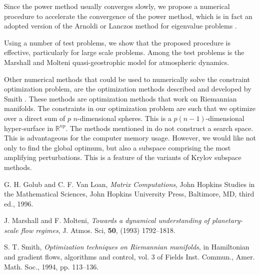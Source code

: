 \documentclass{report}
\begin{document}
Since the power method usually converges slowly, we propose a numerical
procedure to accelerate the convergence of the power method, which is
in fact an adopted version of the Arnoldi or Lanczos method for eigenvalue
problems \cite{golub}.

Using a number of test problems, we show that the proposed procedure is
effective, particularly for large scale problems.
Among the test problems is the Marshall and Molteni quasi-geostrophic model
\cite{molteni} for atmospheric dynamics.

Other numerical methods that could be used to numerically solve the
constraint optimization problem, are the optimization methods described
and developed by Smith \cite{smith}.
These methods are optimization methods that work on Riemannian manifolds.
The constraints in our optimization problem are such that we optimize over
a direct sum of $p$ $n$-dimensional spheres. This is a $p(n-1)$-dimensional
hyper-surface in $\mathbb{R}^{np}$.
The methods mentioned in \cite{smith} do not construct a search
space. This is advantageous for the computer memory usage.
However, we would like not only to find the global optimum, but also
a subspace comprising the most amplifying perturbations.
This is a feature of the variants of Krylov subspace methods.

G. H. Golub and C. F. Van Loan, {\it Matrix Computations}, John Hopkins
Studies in the Mathematical Sciences, John Hopkins University Press,
Baltimore, MD, third ed., 1996.

J. Marshall and F. Molteni, {\it Towards a dynamical understanding of
planetary-scale flow regimes}, J. Atmos. Sci, {\bf 50}, (1993) 1792--1818.

S. T. Smith, {\it Optimization techniques on {R}iemannian manifolds}, in
Hamiltonian and gradient flows, algorithms and control, vol. 3 of Fields
Inst. Commun., Amer. Math. Soc., 1994, pp. 113--136.
\end{document}
